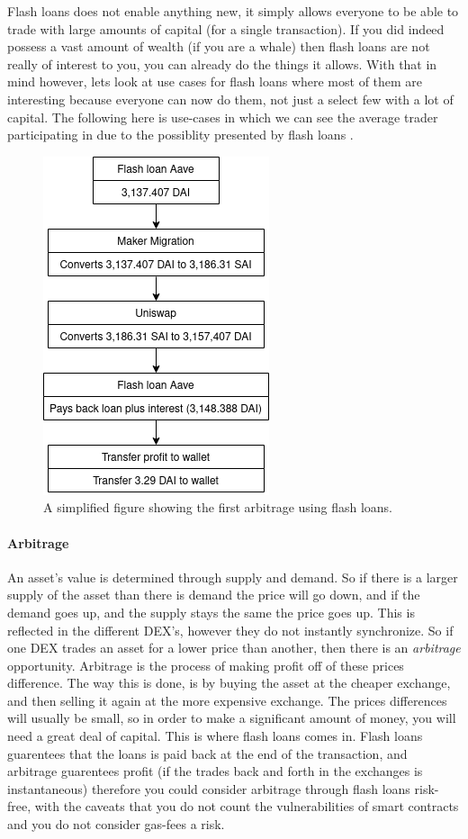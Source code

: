 Flash loans does not enable anything new, it simply allows everyone to be able
to trade with large amounts of capital (for a single transaction). If you did
indeed possess a vast amount of wealth (if you are a whale) then flash loans are
not really of interest to you, you can already do the things it allows. With
that in mind however, lets look at use cases for flash loans where most of them
are interesting because everyone can now do them, not just a select few with a
lot of capital. The following here is use-cases in which we can see the average
trader participating in due to the possiblity presented by flash
loans \cite{attack}.

\begin{figure}
  \centering
  \includegraphics[width=.2\textwidth]{assests/Flash-loans-18-jan}
  \caption{A simplified figure showing the first arbitrage using flash loans.}
  \label{fig:firstArb}
\end{figure}
\paragraph{Arbitrage}
An asset's value is determined through supply and demand. So if there is a larger
supply of the asset than there is demand the price will go down, and if the
demand goes up, and the supply stays the same the price goes up. This is
reflected in the different DEX's, however they do not instantly synchronize. So
if one DEX trades an asset for a lower price than another, then there is
an \textit{arbitrage} opportunity. Arbitrage is the process of making profit off
of these prices difference. The way this is done, is by buying the asset at the
cheaper exchange, and then selling it again at the more expensive exchange. The
prices differences will usually be small, so in order to make a significant
amount of money, you will need a great deal of capital. This is where flash
loans comes in. Flash loans guarentees that the loans is paid back at the end of
the transaction, and arbitrage guarentees profit (if the trades back and forth
in the exchanges is instantaneous) therefore you could consider arbitrage
through flash loans risk-free, with the caveats that you do not count the
vulnerabilities of smart contracts and you do not consider gas-fees a risk.\\

